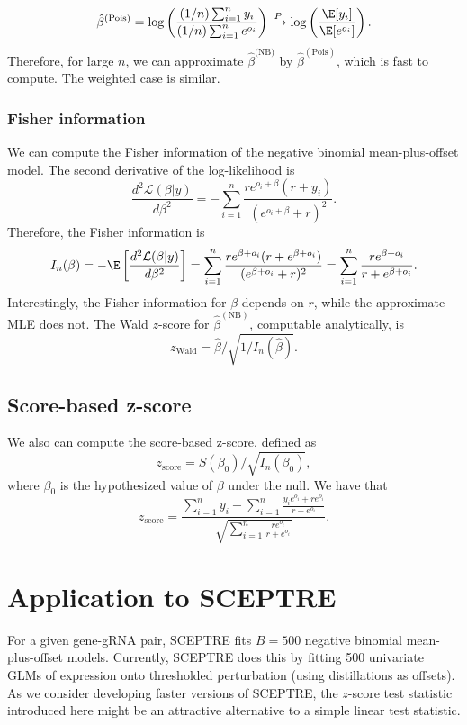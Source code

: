 \documentclass[12pt]{article}
\begin{document}
 $$ \hat{\beta}^{(\textrm{Pois})} =  \log \left( \frac{ (1/n) \sum_{i=1}^n y_i }{ (1/n) \sum_{i=1}^n e^{o_i} } \right) \xrightarrow{P} \log \left( \frac{ \E[y_i] }{ \E[ e^{o_i} ] } \right) .$$ Therefore, for large $n$, we can approximate $\hat{\beta}^{\textrm{(NB)}}$ by $\hat{\beta}^{(\textrm{Pois})}$, which is fast to compute. The weighted case is similar.
 
 \subsubsection{Fisher information}
 
 We can compute the Fisher information of the negative binomial mean-plus-offset model. The second derivative of the log-likelihood is
 $$ \frac{d^2 \mathcal{L}(\beta | y) }{d \beta^2} = - \sum_{i=1}^n \frac{ r e^{o_i + \beta}(r + y_i)}{ \left(e^{o_i + \beta} + r\right)^2 }.$$ Therefore, the Fisher information is
 \begin{multline*} I_n(\beta) = - \E \left[ \frac{d^2 \mathcal{L}(\beta | y) }{d \beta^2}  \right] = \sum_{i=1}^n \frac{ r e^{\beta + o_i} (r + e^{\beta + o_i} )}{ (e^{ \beta + o_i} + r )^2} = \sum_{i=1}^n \frac{ r e^{\beta + o_i} }{r + e^{\beta + o_i}}.
 \end{multline*}
Interestingly, the Fisher information for $\beta$ depends on $r$, while the approximate MLE does not. The Wald $z$-score for $\hat{\beta}^{(\textrm{NB})}$, computable analytically, is 
\begin{equation}\label{z_score}
z_\textrm{Wald} = \hat{\beta}/\sqrt{ 1 / I_n(\hat{\beta})}.
\end{equation}

\subsection{Score-based z-score}
We also can compute the score-based z-score, defined as
$$ z_\textrm{score} = S(\beta_0)/\sqrt{ I_n(\beta_0)},$$ where $\beta_0$ is the hypothesized value of $\beta$ under the null. We have that
$$
z_\textrm{score} = \frac{ \sum_{i=1}^n y_i - \sum_{i=1}^n \frac{y_ie^{o_i} + re^{o_i}}{r + e^{o_i}}}{\sqrt{\sum_{i=1}^n \frac{r e^{o_i}}{r + e^{o_i}}}}.
$$

\section{Application to SCEPTRE}

For a given gene-gRNA pair, SCEPTRE fits $B = 500$ negative binomial mean-plus-offset models. Currently, SCEPTRE does this by fitting 500 univariate GLMs of expression onto thresholded perturbation (using distillations as offsets). %
As we consider developing faster versions of SCEPTRE, the $z$-score test statistic introduced here might be an attractive alternative to a simple linear test statistic. 
 
\end{document}

